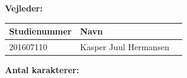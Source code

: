 \begin{center}
	\textbf{Vejleder:} \\
	\vspace{5pt}
	\begin{tabular}{l|ll}
		\textbf{Studienummer} & \textbf{Navn}\\ [5px]
		\hline
		201607110 & Kasper Juul Hermansen\\
	\end{tabular}

	\ifdefined\frontpageCharacters
		\vspace{10pt}
		\textbf{Antal karakterer: } \frontpageCharacters\\
	\fi
	\vspace{30pt}

\end{center}
